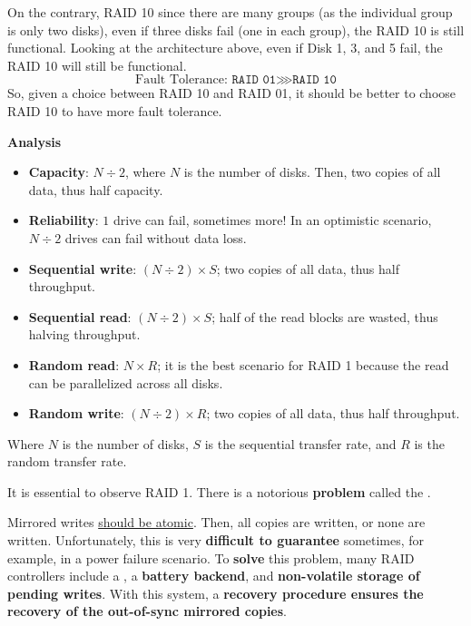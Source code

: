 On the contrary, RAID 10 since there are many groups (as the individual group is only two disks), even if three disks fail (one in each group), the RAID 10 is still functional. Looking at the architecture above, even if Disk 1, 3, and 5 fail, the RAID 10 will still be functional.
\begin{equation*}
    \text{Fault Tolerance: } \texttt{RAID 01} \ggg \texttt{RAID 10}
\end{equation*}
So, given a choice between RAID 10 and RAID 01, it should be better to choose RAID 10 to have more fault tolerance.

\highspace
\begin{flushleft}
    \textcolor{Green3}{ \textbf{Analysis}}
\end{flushleft}
\begin{itemize}
    \item \textbf{Capacity}: $N \div 2$, where $N$ is the number of disks. Then, two copies of all data, thus half capacity.

    \item \textbf{Reliability}: $1$ drive can fail, sometimes more! In an optimistic scenario, $N \div 2$ drives can fail without data loss.

    \item \textbf{Sequential write}: $\left(N \div 2\right) \times S$; two copies of all data, thus half throughput.

    \item \textbf{Sequential read}: $\left(N \div 2\right) \times S$; half of the read blocks are wasted, thus halving throughput.

    \item \textbf{Random read}: $N \times R$; it is the best scenario for RAID 1 because the read can be parallelized across all disks.

    \item \textbf{Random write}: $\left(N \div 2\right) \times R$; two copies of all data, thus half throughput.
\end{itemize}
Where $N$ is the number of disks, $S$ is the sequential transfer rate, and $R$ is the random transfer rate.

\highspace
It is essential to observe RAID 1. There is a notorious \textbf{problem} called the .

Mirrored writes \underline{should be atomic}. Then, all copies are written, or none are written. Unfortunately, this is very \textbf{difficult to guarantee} sometimes, for example, in a power failure scenario. To \textbf{solve} this problem, many RAID controllers include a , a \textbf{battery backend}, and \textbf{non-volatile storage of pending writes}. With this system, a \textbf{recovery procedure ensures the recovery of the out-of-sync mirrored copies}.

